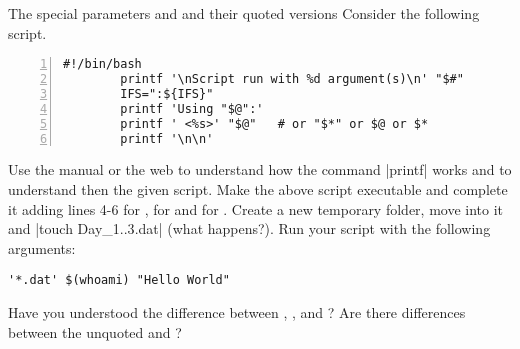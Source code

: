 
\begin{exercise}[Instructive]{The special parameters \bash{*} and \bash{\@} and their quoted versions}
    Consider the following script.
    \begin{lstlisting}[style=MyBash, numbers=left]
        #!/bin/bash
        printf '\nScript run with %d argument(s)\n' "$#"
        IFS=":${IFS}"
        printf 'Using "$@":'
        printf ' <%s>' "$@"   # or "$*" or $@ or $*
        printf '\n\n'
    \end{lstlisting}
    Use the manual or the web to understand how the command \bash|printf| works and to understand then the given script.
    Make the above script executable and complete it adding lines 4-6 for , for  and for \bash{$*}.
    Create a new temporary folder, move into it and \bash|touch Day_{1..3}.dat| (what happens?).
    Run your script with the following arguments:
    \begin{lstlisting}[style=MyBash]
        '*.dat' $(whoami) "Hello World"
    \end{lstlisting}
    Have you understood the difference between , ,  and \bash{$*}?
    Are there differences between the unquoted  and \bash{$*}?
\end{exercise}